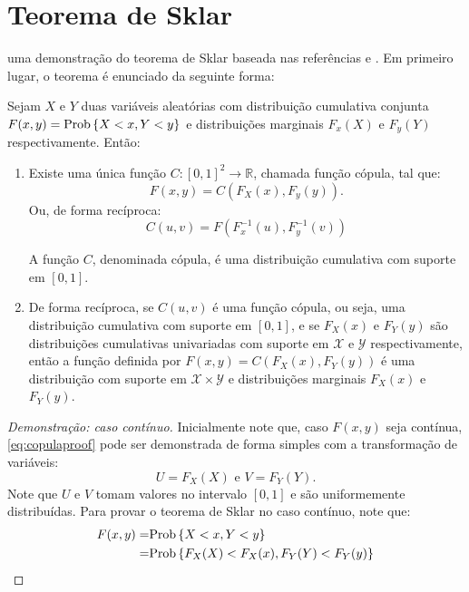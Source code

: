 \chapter{Teorema de Sklar}

 uma demonstração do teorema de Sklar baseada nas referências \citep{Ruschendorf2009}\cite{Ruschendorf2009} e \citep{Faugeras2012}\cite{Faugeras2012}. Em primeiro lugar, o teorema é enunciado da seguinte forma:

\begin{Teorema}
Sejam $X$ e $Y$ duas variáveis aleatórias com distribuição cumulativa conjunta $F(x,y) = \mathrm{Prob}\left\{X < x , Y < y\right\}$ e distribuições marginais $F_x(X)$ e $F_y(Y)$ respectivamente. Então:
\begin{enumerate}
 \item Existe uma única função $C : [0,1]^2 \to \mathbb{R}$, chamada função cópula, tal que:
 \begin{equation}
 \label{eq:copulaproof}
  F(x, y)  = C(F_X(x), F_y(y)).
 \end{equation}
 Ou, de forma recíproca:
 \begin{equation}
 C(u,v) = F(F^{-1}_x(u), F^{-1}_y(v))
 \end{equation}
 
 A função $C$, denominada cópula, é uma distribuição cumulativa com suporte em $[0,1]$.
 
 \item De forma recíproca, se $C(u,v)$ é uma função cópula, ou seja, uma distribuição cumulativa com suporte em $[0,1]$, e se $F_X(x)$ e $F_Y(y)$ são distribuições cumulativas univariadas com suporte em $\mathcal{X}$ e $\mathcal{Y}$ respectivamente, então a função definida por $F(x, y)  = C(F_X(x), F_Y(y))$ é uma distribuição com suporte em $\mathcal{X} \times \mathcal{Y}$ e distribuições marginais $F_X(x)$ e $F_Y(y)$.
\end{enumerate}

\begin{proof}[Demonstração: caso contínuo]
Inicialmente note que, caso $F(x,y)$ seja contínua, \eqref{eq:copulaproof} pode ser demonstrada de forma simples com a transformação de variáveis:
\[
 U = F_X(X) \text{ e } V = F_Y(Y). 
\]
Note que $U$ e $V$ tomam valores no intervalo $[0,1]$ e são uniformemente distribuídas. Para provar o teorema de Sklar no caso contínuo, note que:
\begin{align}
 \label{eq:continous}
  F(x, y) = & \Prob{X < x , Y < y}  \nonumber \\ 
          = & \Prob{F_X(X) < F_X(x), F_Y(Y) < F_Y(y)}
\end{align}


\end{proof}
\end{Teorema}
